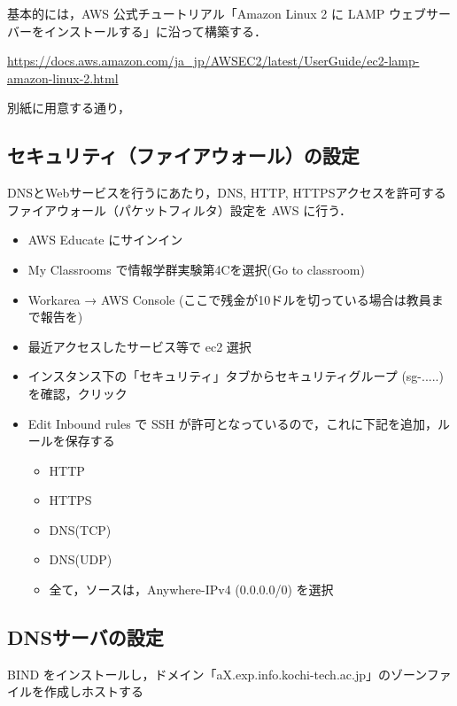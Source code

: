 基本的には，AWS 公式チュートリアル「Amazon Linux 2 に LAMP ウェブサーバーをインストールする」に沿って構築する．

\url{https://docs.aws.amazon.com/ja_jp/AWSEC2/latest/UserGuide/ec2-lamp-amazon-linux-2.html}

別紙に用意する通り，

\subsection{セキュリティ（ファイアウォール）の設定}

DNSとWebサービスを行うにあたり，DNS, HTTP, HTTPSアクセスを許可するファイアウォール（パケットフィルタ）設定を AWS に行う．

\begin{itemize}
    \item AWS Educate にサインイン
    \item My Classrooms で情報学群実験第4Cを選択(Go to classroom)
    \item Workarea → AWS Console (ここで残金が10ドルを切っている場合は教員まで報告を)
    \item 最近アクセスしたサービス等で ec2 選択
    \item インスタンス下の「セキュリティ」タブからセキュリティグループ (sg-.....) を確認，クリック
    \item Edit Inbound rules で SSH が許可となっているので，これに下記を追加，ルールを保存する
    \begin{itemize}
        \item HTTP
        \item HTTPS
        \item DNS(TCP)
        \item DNS(UDP)
        \item 全て，ソースは，Anywhere-IPv4 (0.0.0.0/0) を選択
    \end{itemize}
\end{itemize}

\subsection{DNSサーバの設定}

BIND をインストールし，ドメイン「aX.exp.info.kochi-tech.ac.jp」のゾーンファイルを作成しホストする

